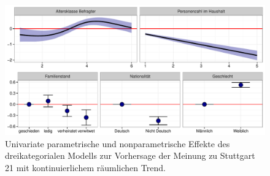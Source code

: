 \documentclass{Vorlage}
\begin{document}
\begin{figure}[h]
 \begin{center}
 \includegraphics[scale=0.8]{Pictures/S21ModelEffects2}
 \caption{Univariate parametrische und nonparametrische Effekte des dreikategorialen Modells zur Vorhersage der Meinung zu Stuttgart 21 mit kontinuierlichem räumlichen Trend.}
 \label{GKParam}
 \end{center}
\end{figure}
\end{document}
